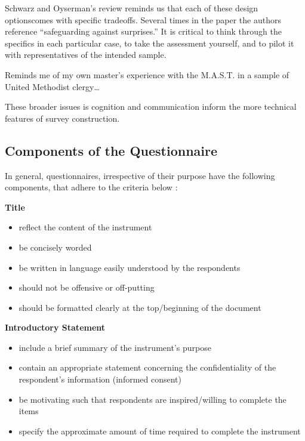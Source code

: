 \documentclass[
  english,
]{book}
\providecommand{\tightlist}{%
  \setlength{\itemsep}{0pt}\setlength{\parskip}{0pt}}
\begin{document}
Schwarz and Oyserman's \citeyearpar{schwarz_asking_2001} review reminds us that each of these design optionscomes with specific tradeoffs. Several times in the paper the authors reference ``safeguarding against surprises.'' It is critical to think through the specifics in each particular case, to take the assessment yourself, and to pilot it with representatives of the intended sample.

Reminds me of my own master's experience with the M.A.S.T. in a sample of United Methodist clergy\ldots{}

These broader issues is cognition and communication inform the more technical features of survey construction.

\hypertarget{components-of-the-questionnaire}{%
\subsection{Components of the Questionnaire}\label{components-of-the-questionnaire}}

In general, questionnaires, irrespective of their purpose have the following components, that adhere to the criteria below \citep{colton_designing_2015, pershing_ineffective_2001}:

\textbf{Title}

\begin{itemize}
\tightlist
\item
  reflect the content of the instrument
\item
  be concisely worded
\item
  be written in language easily understood by the respondents
\item
  should not be offensive or off-putting
\item
  should be formatted clearly at the top/beginning of the document
\end{itemize}

\textbf{Introductory Statement}

\begin{itemize}
\tightlist
\item
  include a brief summary of the instrument's purpose
\item
  contain an appropriate statement concerning the confidentiality of the respondent's information (informed consent)
\item
  be motivating such that respondents are inspired/willing to complete the items
\item
  specify the approximate amount of time required to complete the instrument
\end{itemize}
\end{document}
